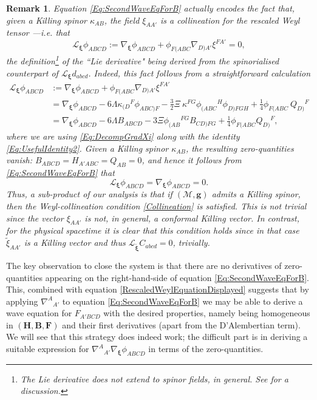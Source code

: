\documentclass[10pt,a4paper]{article}
\theoremstyle{plain}
\newtheorem{remark}{Remark}
\def\bmg{{\bm g}}
\def\bmB{{\bm B}}
\def\bmF{{\bm F}}
\def\bmH{{\bm H}}
\begin{document}
\begin{remark}
  \emph{ Equation \eqref{Eq:SecondWaveEqForB} actually encodes the
  fact that, \emph{given a Killing spinor} $\kappa_{AB}$, the field
  $\xi_{AA'}$ is a collineation for the rescaled Weyl tensor
  ---i.e. that
\[  \mathcal{L}_{\bm\xi}\phi_{ABCD} := \nabla_{\bm\xi}\phi_{ABCD} + \phi_{F(ABC}\nabla_{D)A'}\xi^{FA'}=0,\] 
the definition\footnote{The Lie derivative does not extend to spinor
fields, in general. See \cite{PenRin86} for a discussion.} of the
``Lie derivative" being derived from the spinorialised counterpart of
$\mathcal{L}_{\bm\xi}d_{abcd}$. Indeed, this fact follows from a
straightforward calculation
\begin{align*}
    \mathcal{L}_{\bm\xi}\phi_{ABCD}&:= \nabla_{\bm\xi}\phi_{ABCD}
    + \phi_{F(ABC}\nabla_{D)A'}\xi^{FA'} \\ &=
    \nabla_{\bm\xi}\phi_{ABCD}-6\Lambda \kappa_{(D}{}^{F} \phi_{ABC)F}
    - \tfrac{3}{2} \Xi \ \kappa^{FG} \phi_{(ABC}{}^{H} \phi_{D)FGH} +
    \tfrac{1}{4} \phi_{F(ABC} \ Q_{D)}{}^{F}\\ &=
    \nabla_{\bm\xi}\phi_{ABCD}-6\Lambda B_{ABCD} - 3\Xi
    \phi_{(AB}{}^{FG}B_{CD)FG} + \tfrac{1}{4}\phi_{F(ABC}Q_{D)}{}^F,
\end{align*}
where we are using \eqref{Eq:DecompGradXi} along with the identity
\eqref{Eq:UsefulIdentity2}. Given a Killing spinor $\kappa_{AB}$, the
resulting zero-quantities vanish: $B_{ABCD}=H_{A'ABC}=Q_{AB}=0$, and
hence it follows from \eqref{Eq:SecondWaveEqForB} that
\begin{equation}\mathcal{L}_{\bm\xi}\phi_{ABCD} = \nabla_{\bm\xi}\phi_{ABCD} =0. \label{Collineation}
\end{equation}
Thus, a sub-product of our analysis is that if $(\mathcal{M},\bmg)$
admits a Killing spinor, then the Weyl-collineation condition
\eqref{Collineation} is satisfied.  This is not trivial since the
vector $\xi_{AA'}$ is not, in general, a
conformal Killing vector. In contrast,
for the physical spacetime it is clear that this condition holds 
since in that case $\tilde{\xi}_{AA'}$ is a Killing vector and thus
$\mathcal{L}_{\bm{\tilde{\xi}}}C_{abcd}=0$, trivially.
}
\end{remark}

The key observation to close the system is that there are no derivatives of zero-quantities
appearing on the right-hand-side of equation \eqref{Eq:SecondWaveEqForB}. This,
combined with equation \eqref{RescaledWeylEquationDisplayed}
suggests
that by applying $\nabla^A{}_{A'}$ to equation
\eqref{Eq:SecondWaveEqForB} we may be able to derive a wave equation
for $F_{A'BCD}$ with the desired properties, namely being homogeneous
in $(\bmH, \bmB, \bmF)$ and their first derivatives (apart from the
D'Alembertian term). We will see that this strategy does indeed work;
the difficult part is in deriving a suitable expression for
$\nabla^A{}_{A'}\nabla_{\bm\xi}\phi_{ABCD}$ in terms of the zero-quantities.
\end{document}
